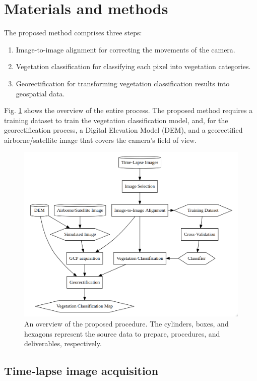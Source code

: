 \documentclass{article}
\providecommand{\tightlist}{%
  \setlength{\itemsep}{0pt}\setlength{\parskip}{0pt}}
\begin{document}
\hypertarget{materials-and-methods}{%
\section{Materials and methods}\label{materials-and-methods}}

The proposed method comprises three steps:
\begin{enumerate}
\def\labelenumi{\arabic{enumi}.}
\tightlist
\item
Image-to-image alignment for correcting the movements of the camera.
\item
Vegetation classification for classifying each pixel into vegetation categories.
\item
Georectification for transforming vegetation classification results into geospatial data.
\end{enumerate}

Fig. \ref{fig:diagram} shows the overview of the entire process. The proposed method requires a training dataset to train the vegetation classification model, and, for the georectification process, a Digital Elevation Model (DEM), and a georectified airborne/satellite image that covers the camera's field of view.



\begin{figure}
\includegraphics[width=0.8\linewidth]{paper_files/figures/diagram} 
\caption{An overview of the proposed procedure. The cylinders, boxes, and hexagons represent the source data to prepare, procedures, and deliverables, respectively.}
\label{fig:diagram}
\end{figure}

\hypertarget{time-lapse-image-acquisition}{%
\subsection{Time-lapse image acquisition}\label{time-lapse-image-acquisition}}
\end{document}
